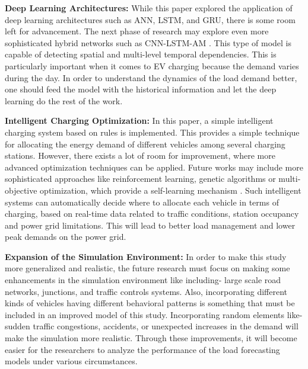 \documentclass{thesis-library}
\begin{document}
{\vspace{0.5em}
\noindent\textbf{Deep Learning Architectures:} While this paper explored the application of deep learning architectures such as ANN, LSTM, and GRU, there is some room left for advancement. The next phase of research may explore even more sophisticated hybrid networks such as CNN-LSTM-AM \cite{ran2025ev}. This type of model is capable of detecting spatial and multi-level temporal dependencies. This is particularly important when it comes to EV charging because the demand varies during the day. In order to understand the dynamics of the load demand better, one should feed the model with the historical information and let the deep learning do the rest of the work.

\vspace{0.5em}
\noindent\textbf{Intelligent Charging Optimization:} In this paper, a simple intelligent charging system based on rules is implemented. This provides a simple technique for allocating the energy demand of different vehicles among several charging stations. However, there exists a lot of room for improvement, where more advanced optimization techniques can be applied.
Future works may include more sophisticated approaches like reinforcement learning,
genetic algorithms or multi-objective optimization, which provide a self-learning mechanism 
\cite{hua2014adaptive}.
Such intelligent systems can automatically decide where to allocate each vehicle in terms of charging,
based on real-time data related to traffic conditions, station occupancy and power grid limitations.
This will lead to better load management and lower peak demands on the power grid.

\vspace{0.5em}
\noindent\textbf{Expansion of the Simulation Environment:} In order to make this study more generalized and realistic, the
future research must focus on making some enhancements in the simulation environment like including- 
large scale road networks, junctions, and traffic controls systems. Also, incorporating different kinds of vehicles
having different behavioral patterns is something that must be included in an improved model of this study.
Incorporating random elements like- sudden traffic congestions, accidents, or unexpected increases in the demand
will make the simulation more realistic. Through these improvements, it will become easier for the researchers
to analyze the performance of the load forecasting models under various circumstances.

}
\end{document}
